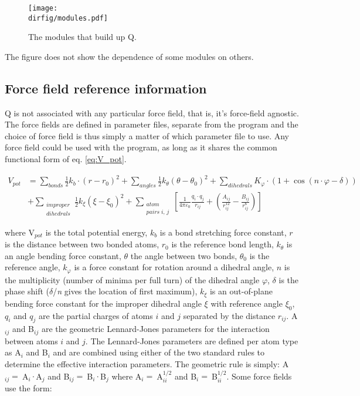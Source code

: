 \documentclass[a4paper,10pt]{article}
\newcommand{\dirfig}{./pictures}
\begin{document}
\begin{figure}[h]
\centerline{\texttt{[image: \\dirfig/modules.pdf]}}
\caption{The modules that build up Q.} \label{fig:modules}
\end{figure}

The figure does not show the dependence of some modules on others.

\subsection{Force field reference information}
Q is  not associated with  any particular  force field, that  is, it's
force-field agnostic. The force fields are defined in parameter files,
separate from the program and the choice of force field is thus simply
a matter of which parameter file to use. Any force field could be used
with the program,  as long as it shares the  common functional form of
eq.  \ref{eq:V_pot}.

\begin{align}
\label{eq:V_pot}
 V_{pot} & =\sum\limits_{bonds} {\frac{1}{2}k_b \cdot \left( {r-r_0
} \right)^2} +\sum\limits_{angles} {\frac{1}{2}k_\theta \left(
{\theta -\theta_0} \right)^2} +\sum\limits_{dihedrals} {K_\varphi
\cdot \left( {1+\cos \left( {n\cdot \varphi -\delta } \right)}
\right)} \nonumber \\ 
& +\sum\limits_{\substack{improper \\ dihedrals}}
{\frac{1}{2}k_\xi \left( {\xi -\xi _0} \right)^2}
+\sum\limits_{\substack{atom \\ pairs \; i , \, j}}
\left[
{\frac{1}{4 \pi \varepsilon_{0} } \frac{q_i \cdot q_j}
{r_{ij}} + \left( \frac{A_{ij}}{r_{ij}^{12}} -
\frac{B_{ij}}{r_{ij}^{6}} \right)}
\right]
\end{align}

where V$_{pot}$ is the total potential energy, $k_{b}$ is a bond
stretching force constant, $r$ is the distance between two bonded
atoms, $r_{0}$ is the reference bond length, $k_{\theta }$ is an
angle bending force constant, $\theta$  the angle between two
bonds, $\theta _{0}$ is the reference angle, $k_{\varphi }$ is a
force constant for rotation around a dihedral angle, $n$ is the
multiplicity (number of minima per full turn) of the dihedral
angle $\varphi$, $\delta$  is the phase shift ($\delta$/\emph{n}
gives the location of first maximum), $k_{\xi }$ is an
out-of-plane bending force constant for the improper dihedral
angle $\xi$ with reference angle $\xi_{0}$, $q_{i}$ and $q_{j}$
are the partial charges of atoms $i$ and $j$ separated by the
distance $r_{ij}$. A$_{ij}$ and B$_{ij}$ are the geometric
Lennard-Jones parameters for the interaction between atoms $i$ and
$j$. The Lennard-Jones parameters are defined per atom type as
A$_{i}$ and B$_{i}$ and are combined using either of the two
standard rules to determine the effective interaction parameters.
The geometric rule is simply: A$_{ij}= \:$A$_{i}\cdot $A$_{j}$ and
B$_{ij}=\:$B$_{i}\cdot $B$_{j}$ where A$_{i}=\:$A$_{ii}^{1/2}$ and
B$_{i}=\:$B$_{ii}^{1/2}$. Some force fields use the form:\\
\end{document}
